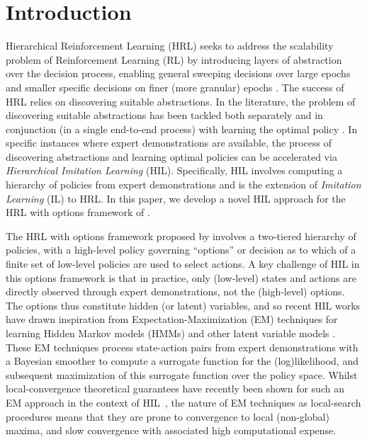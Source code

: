 
\section{Introduction}
\label{sec:introduction}
Hierarchical Reinforcement Learning (HRL) seeks to address the scalability problem of Reinforcement Learning (RL) by introducing layers of abstraction over the decision process, enabling  general sweeping decisions over large epochs and smaller specific decisions on finer (more granular) epochs \citep{SUTTON1999181, Barto2003}. The success of HRL relies on discovering suitable abstractions. 
In the literature, the problem of discovering suitable abstractions has been tackled both separately and in conjunction (in a single end-to-end process) with learning the optimal policy \citep{Barto2003}.
In specific instances where expert demonstrations are available, the process of discovering abstractions and learning optimal policies can be accelerated via \emph{Hierarchical Imitation Learning} (HIL).
Specifically, HIL involves computing a hierarchy of policies from expert demonstrations and is the extension of \emph{Imitation Learning} (IL) to HRL.
In this paper, we develop a novel HIL approach for the HRL with options framework of \citep{SUTTON1999181}.

The HRL with options framework proposed by \cite{SUTTON1999181} involves a two-tiered hierarchy of policies, with a high-level policy governing ``options'' or decision as to which of a finite set of low-level policies are used to select actions.
A key challenge of HIL in this options framework is that in practice, only (low-level) states and actions are directly observed through expert demonstrations, not the (high-level) options.
The options thus constitute hidden (or latent) variables, and so recent HIL works have drawn inspiration from Expectation-Maximization (EM) techniques for learning Hidden Markov models (HMMs) and other latent variable models \citep{Daniel2016,zhiyu20,Giammarino_2021}.
These EM techniques process state-action pairs from expert demonstrations with a Bayesian smoother to compute a surrogate function for the (log)likelihood, and subsequent maximization of this surrogate function over the policy space.
Whilst local-convergence theoretical guarantees have recently been shown for such an EM approach in the context of HIL~\citep{zhiyu20}, the nature of EM techniques as local-search procedures means that they are prone to convergence to local (non-global) maxima, and slow convergence with associated high computational expense.

